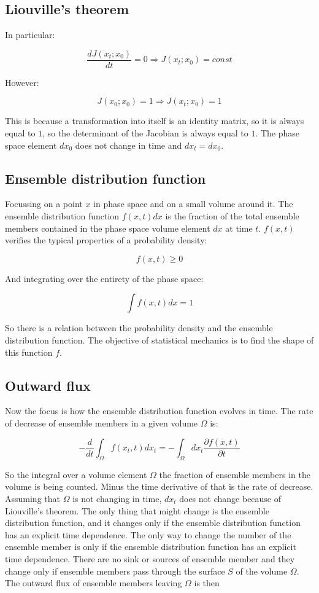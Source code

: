	\subsection{Liouville's  theorem}
	In particular:

	$$\frac{dJ(x_t;x_0)}{dt} = 0\Rightarrow J(x_t;x_0) = const$$

	However:

	$$J(x_0;x_0) = 1\Rightarrow J(x_t;x_0) = 1$$

	This is because a transformation into itself is an identity matrix, so it is always equal to $1$, so the determinant of the Jacobian is always equal to $1$.
	The phase space element $dx_0$ does not change in time and $dx_t = dx_0$.

	\subsection{Ensemble distribution function}
	Focussing  on a point $x$ in phase space and on a small volume around it.
	The ensemble distribution function $f(x,t)dx$ is the fraction of the total ensemble members contained in the phase space volume element $dx$ at time $t$.
	$f(x,t)$ verifies the typical properties of a probability density:

	$$f(x,t) \ge 0$$

	And integrating over the entirety of the phase space:

	$$\int f(x,t)dx = 1$$

	So there is a relation between the probability density and the ensemble distribution function.
	The objective of statistical mechanics is to find the shape of this function $f$.

	\subsection{Outward flux}
	Now the focus is how the ensemble distribution function evolves in time.
	The rate of decrease of ensemble members in a given volume $\Omega$ is:

	$$-\frac{d}{dt}\int_\Omega f(x_t, t)dx_t = -\int_\Omega dx_t\frac{\partial f(x,t)}{\partial t}$$

	So the integral over a volume element $\Omega$ the fraction of ensemble members in the volume is being counted.
	Minus the time derivative of that is the rate of decrease.
	Assuming that $\Omega$ is not changing in time, $dx_t$ does not change because of Liouville's theorem.
	The only thing that might change is the ensemble distribution function, and it changes only if the ensemble distribution function has an explicit time dependence.
	The only way to change the number of the ensemble member is only if the ensemble distribution function has an explicit time dependence.
	There are no sink or sources of ensemble member and they change only if ensemble members pass through the surface $S$ of the volume $\Omega$.
	The outward flux of ensemble members leaving $\Omega$ is then

